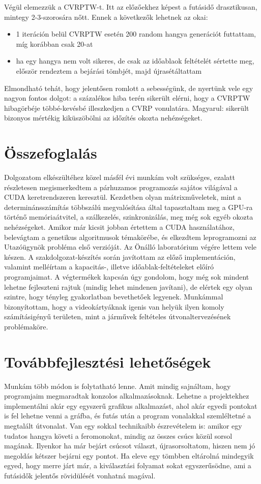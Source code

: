 Végül elemezzük a CVRPTW-t. Itt az előzőekhez képest a futásidő drasztikusan, mintegy 2-3-szorosára nőtt. Ennek a következők lehetnek az okai:
\begin{itemize}
	\item 1 iteráción belül CVRPTW esetén 200 random hangya generációt futtattam, míg korábban csak 20-at
	\item ha egy hangya nem volt sikeres, de csak az időablaok feltételét sértette meg, először rendeztem a bejárási tömbjét, majd újrasétáltattam
\end{itemize}
Elmondható tehát, hogy jelentősen romlott a sebességünk, de nyertünk vele egy nagyon fontos dolgot: a százalékos hiba terén sikerült elérni, hogy a CVRPTW hibagörbéje többé-kevésbé illeszkedjen a CVRP vonulatára. Magyarul: sikerült bizonyos mértékig kiküszöbölni az időzítés okozta nehézségeket.

\section{Összefoglalás}
Dolgozatom elkészültéhez közel másfél évi munkám volt szükséges, ezalatt részletesen megismerkedtem a párhuzamos programozás sajátos világával a CUDA keretrendszeren keresztül. Kezdetben olyan mátrixműveletek, mint a determinánsszámítás többszálú megvalósítása által tapasztaltam meg a GPU-ra történő memóriaátvitel, a szálkezelés, szinkronizálás, meg még sok egyéb okozta nehézségeket. Amikor már kicsit jobban értettem a CUDA használatához, belevágtam a genetikus algoritmusok témakörébe, és elkezdtem leprogramozni az Utazóügynök probléma első verzióját. Az Önálló laboratórium végére lettem vele készen. A szakdolgozat-készítés során javítottam az előző implementáción, valamint melléírtam a kapacitás-, illetve időablak-feltételeket előíró programjaimat. A végtermékek kapcsán úgy gondolom, hogy még sok mindent lehetne fejleszteni rajtuk (mindig lehet mindenen javítani), de elértek egy olyan szintre, hogy tényleg gyakorlatban bevethetőek legyenek. Munkámmal bizonyítottam, hogy a videokártyáknak igenis van helyük ilyen komoly számításigényű területen, mint a járművek feltételes útvonaltervezésének problémaköre.

\section{Továbbfejlesztési lehetőségek}

Munkám több módon is folytatható lenne. Amit mindig sajnáltam, hogy programjaim megmaradtak konzolos alkalmazásoknak. Lehetne a projektekhez implementálni akár egy egyszerű grafikus alkalmazást, ahol akár egyedi pontokat is fel lehetne venni a gráfba, és futás után a program vonalakkal szemléltetné a megtalált útvonalat. Van egy sokkal technikaibb észrevételem is: amikor egy tudatos hangya követi a feromonokat, mindig az összes csúcs közül sorsol magának. Ilyenkor ha már bejárt csúcsot választ, újrasorsoltatom, hiszen nem jó megoldás kétszer bejárni egy pontot. Ha eleve egy tömbben eltárolná mindegyik egyed, hogy merre járt már, a kiválasztási folyamat sokat egyszerűsödne, ami a futásidők jelentős rövidülését vonhatná magával.

